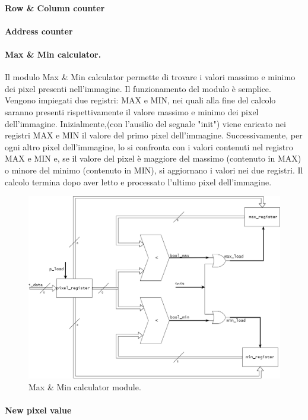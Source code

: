\paragraph{Row \& Column counter}
\paragraph{Address counter}
\paragraph{Max \& Min calculator.}

Il modulo Max \& Min calculator permette di trovare i valori massimo e minimo dei pixel presenti nell'immagine.
Il funzionamento del modulo è semplice. Vengono impiegati due registri: MAX e MIN, nei quali alla fine del calcolo saranno presenti rispettivamente il valore massimo e minimo dei pixel dell'immagine.
Inizialmente,(con l'ausilio del segnale "init") viene caricato nei registri MAX e MIN il valore del primo pixel dell'immagine. Successivamente, per ogni altro pixel dell'immagine, lo si confronta con i valori contenuti nel registro MAX e MIN e, se il valore del pixel è maggiore del massimo (contenuto in MAX) o minore del minimo (contenuto in MIN), si aggiornano i valori nei due registri.
Il calcolo termina dopo aver letto e processato l'ultimo pixel dell'immagine.

\begin{figure}[h!] %
  \includegraphics[width=\linewidth]{max_min_module}
  \caption{Max \& Min calculator module.}
  \label{fig:maxMin}
\end{figure}

\paragraph{New pixel value}
